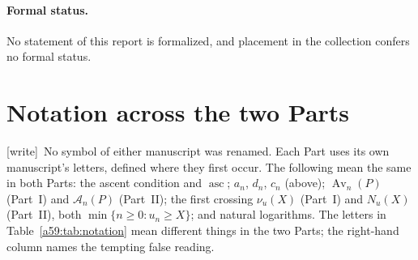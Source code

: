 \documentclass[11pt,letterpaper]{article}
\theoremstyle{remark}\newtheorem{remark}[theorem]{Remark}
\newcommand{\asc}{\operatorname{asc}}\newcommand{\Av}{\operatorname{Av}}\newcommand{\N}{\mathbb N}\newcommand{\E}{\mathbb E}\newcommand{\Prob}{\mathbb P}
\newcommand{\A}{\mathcal A}
\newcommand{\wtag}{\textup{[write]}}
\theoremstyle{remark}\newtheorem{wremark}{Remark}\renewcommand{\thewremark}{W\arabic{wremark}}
\theoremstyle{plain}\newtheorem{wcorollary}[wremark]{Corollary}
\begin{document}
\paragraph{Formal status.} No statement of this report is formalized, and
placement in the collection confers no formal status.

\section{Notation across the two Parts}\label{a59:sec:notation}

\wtag\ No symbol of either manuscript was renamed. Each Part uses its own
manuscript's letters, defined where they first occur. The following mean
the same in both Parts: the ascent condition and $\asc$; $a_n$, $d_n$,
$c_n$ (above); $\Av_n(P)$ (Part~I) and $\A_n(P)$ (Part~II); the first
crossing $\nu_u(X)$ (Part~I) and $N_u(X)$ (Part~II), both
$\min\{n\ge0:u_n\ge X\}$; and natural logarithms. The letters in
Table~\ref{a59:tab:notation} mean different things in the two Parts; the
right-hand column names the tempting false reading.
\end{document}

